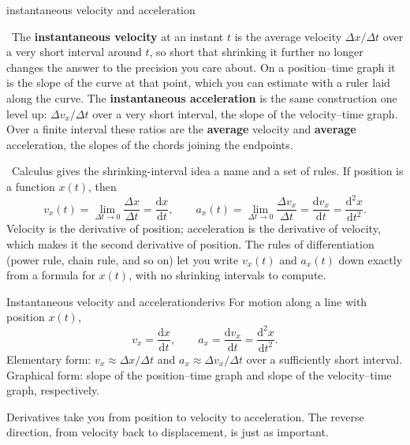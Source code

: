 \documentclass[11pt,twoside,openany]{book}
\newcommand{\dd}{\mathrm{d}}
\newcommand{\deriv}[2]{\frac{\dd #1}{\dd #2}}
\newcommand{\dderiv}[2]{\frac{\dd^2 #1}{\dd #2^2}}
\newcommand{\viewtag}[3]{\fcolorbox{#2}{#3}{\footnotesize\textbf{\textcolor{#2}{#1}}}}
\newcommand{\elemtag}{\viewtag{Elementary}{elemcol}{elempale}}
\newcommand{\calctag}{\viewtag{Calculus}{calccol}{calcpale}}
\newcommand{\elem}{\par\medskip\noindent\elemtag\ }
\newcommand{\calc}{\par\medskip\noindent\calctag\ }
\begin{document}
\begin{twoviews}{instantaneous velocity and acceleration}
\elem The \textbf{instantaneous velocity} at an instant $t$ is the average velocity $\Delta x/\Delta t$ over a very short interval around $t$, so short that shrinking it further no longer changes the answer to the precision you care about. On a position--time graph it is the slope of the curve at that point, which you can estimate with a ruler laid along the curve. The \textbf{instantaneous acceleration} is the same construction one level up: $\Delta v_x/\Delta t$ over a very short interval, the slope of the velocity--time graph. Over a finite interval these ratios are the \textbf{average} velocity and \textbf{average} acceleration, the slopes of the chords joining the endpoints.

\calc Calculus gives the shrinking-interval idea a name and a set of rules. If position is a function $x(t)$, then
\[
v_x(t) = \lim_{\Delta t \to 0}\frac{\Delta x}{\Delta t} = \deriv{x}{t},
\qquad
a_x(t) = \lim_{\Delta t \to 0}\frac{\Delta v_x}{\Delta t} = \deriv{v_x}{t} = \dderiv{x}{t}.
\]
Velocity is the derivative of position; acceleration is the derivative of velocity, which makes it the second derivative of position. The rules of differentiation (power rule, chain rule, and so on) let you write $v_x(t)$ and $a_x(t)$ down exactly from a formula for $x(t)$, with no shrinking intervals to compute.
\end{twoviews}

\begin{definition}{Instantaneous velocity and acceleration}{derivs}
For motion along a line with position $x(t)$,
\[
v_x = \deriv{x}{t}, \qquad a_x = \deriv{v_x}{t} = \dderiv{x}{t}.
\]
Elementary form: $v_x \approx \Delta x/\Delta t$ and $a_x \approx \Delta v_x/\Delta t$ over a sufficiently short interval. Graphical form: slope of the position--time graph and slope of the velocity--time graph, respectively.
\end{definition}

Derivatives take you from position to velocity to acceleration. The reverse direction, from velocity back to displacement, is just as important.
\end{document}
